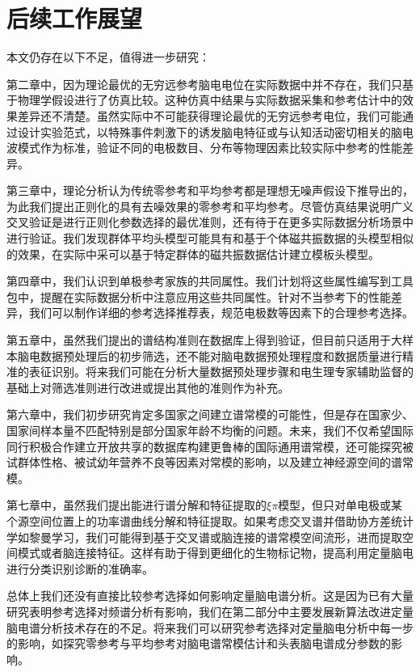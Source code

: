 \section{后续工作展望}
本文仍存在以下不足，值得进一步研究：

第二章中，因为理论最优的无穷远参考脑电电位在实际数据中并不存在，我们只基于物理学假设进行了仿真比较。这种仿真中结果与实际数据采集和参考估计中的效果差异还不清楚。虽然实际中不可能获得理论最优的无穷远参考电位，我们可能通过设计实验范式，以特殊事件刺激下的诱发脑电特征或与认知活动密切相关的脑电波模式作为标准，验证不同的电极数目、分布等物理因素比较实际中参考的性能差异。

第三章中，理论分析认为传统零参考和平均参考都是理想无噪声假设下推导出的，为此我们提出正则化的具有去噪效果的零参考和平均参考。尽管仿真结果说明广义交叉验证是进行正则化参数选择的最优准则，还有待于在更多实际数据分析场景中进行验证。我们发现群体平均头模型可能具有和基于个体磁共振数据的头模型相似的效果，在实际中采可以基于特定群体的磁共振数据估计建立模板头模型。

第四章中，我们认识到单极参考家族的共同属性。我们计划将这些属性编写到工具包中，提醒在实际数据分析中注意应用这些共同属性。针对不当参考下的性能差异，我们可以制作详细的参考选择推荐表，规范电极数等因素下的合理参考选择。

第五章中，虽然我们提出的谱结构准则在数据库上得到验证，但目前只适用于大样本脑电数据预处理后的初步筛选，还不能对脑电数据预处理程度和数据质量进行精准的表征识别。将来我们可能在分析大量数据预处理步骤和电生理专家辅助监督的基础上对筛选准则进行改进或提出其他的准则作为补充。

第六章中，我们初步研究肯定多国家之间建立谱常模的可能性，但是存在国家少、国家间样本量不匹配特别是部分国家年龄不均衡的问题。未来，我们不仅希望国际同行积极合作建立开放共享的数据库构建更鲁棒的国际通用谱常模，还可能探究被试群体性格、被试幼年营养不良等因素对常模的影响，以及建立神经源空间的谱常模。

第七章中，虽然我们提出能进行谱分解和特征提取的$\xi\pi$模型，但只对单电极或某个源空间位置上的功率谱曲线分解和特征提取。如果考虑交叉谱并借助协方差统计学如黎曼学习，我们可能得到基于交叉谱或脑连接的谱常模空间流形，进而提取空间模式或者脑连接特征。这样有助于得到更细化的生物标记物，提高利用定量脑电进行分类识别诊断的准确率。

总体上我们还没有直接比较参考选择如何影响定量脑电谱分析。这是因为已有大量研究表明参考选择对频谱分析有影响，我们在第二部分中主要发展新算法改进定量脑电谱分析技术存在的不足。将来我们可以研究参考选择对定量脑电分析中每一步的影响，如探究零参考与平均参考对脑电谱常模估计和头表脑电谱成分参数的影响。